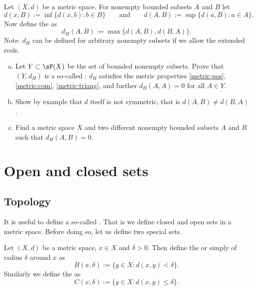 \documentclass[12pt]{book}
\begin{document}
\begin{exercise} \label{exercise:mshausdorffpseudo}
Let $(X,d)$ be a metric space.
For nonempty bounded subsets $A$ and $B$ let
\begin{equation*}
d(x,B) := \inf \{ d(x,b) : b \in B \}
\qquad \text{and} \qquad
d(A,B) := \sup \{ d(a,B) : a \in A \} .
\end{equation*}
Now define the \emph{} as
\begin{equation*}
d_H(A,B) := \max \{ d(A,B) , d(B,A) \} .
\end{equation*}
Note: $d_H$ can be defined for arbitrary nonempty subsets if we allow the
extended reals.
\begin{enumerate}[a)]
 \item Let $Y \subset \sP(X)$ be the set of bounded nonempty subsets.
Prove that
$(Y,d_H)$ is a so-called \emph{}:
$d_H$ satisfies the metric properties
\ref{metric:pos},
\ref{metric:com}, 
\ref{metric:triang}, and further
$d_H(A,A) = 0$ for all $A \in Y$. 
  \item Show by example that $d$ itself is not symmetric, that is $d(A,B) \not=
d(B,A)$.
   \item Find a metric space $X$ and two different
nonempty bounded subsets $A$ and $B$ such that $d_H(A,B) = 0$.
\end{enumerate}
\end{exercise}


\sectionnewpage
\section{Open and closed sets}
\label{sec:mettop}


\subsection*{Topology}

It is useful to define a so-called \emph{}.
That is
we define closed and open sets in a metric space.
Before doing so,
let us define two special sets.

\begin{defn}
Let $(X,d)$ be a metric space, $x \in X$ and $\delta > 0$.
Then define
the \emph{} or simply \emph{} of radius $\delta$
around $x$ as
\begin{equation*}
B(x,\delta) := \{ y \in X : d(x,y) < \delta \} .
\end{equation*}
Similarly we define the \emph{} as
\begin{equation*}
C(x,\delta) := \{ y \in X : d(x,y) \leq \delta \} .
\end{equation*}
\end{defn}
\end{document}

